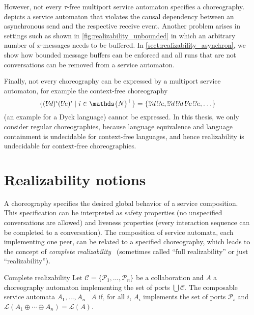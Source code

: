 However, not every $\tau$-free multiport service automaton specifies a choreography.  depicts a service automaton that violates the causal dependency between an asynchronous send and the respective receive event. Another problem arises in settings such as shown in \autoref{fig:realizability_unbounded} in which an arbitrary number of $x$-messages needs to be buffered. In \autoref{sect:realizability_asynchron}, we show how bounded message buffers can be enforced and all runs that are not conversations can be removed from a service automaton.

Finally, not every choreography can be expressed by a multiport service automaton, for example the context-free choreography$$\{({\sync d})^i({\sync e})^i\mid i\in\mathds{N}^{+}\}  = \{{\sync d}\,{\sync e},{\sync d}\,{\sync d}\,{\sync e}\,{\sync e},\dots\}$$ (an example for a Dyck language) cannot be expressed. In this thesis, we only consider regular choreographies, because language equivalence and language containment is undecidable for context-free languages, and hence realizability is undecidable for context-free choreographies.





\section{Realizability notions}
\label{sect:realizability_realizability}

A choreography specifies the desired global behavior of a service composition. This specification can be interpreted as safety properties (no unspecified conversations are allowed) and liveness properties (every interaction sequence can be completed to a conversation). The composition of service automata, each implementing one peer, can be related to a specified choreography, which leads to the concept of \emph{complete realizability}~\cite{SuBFZ_2007_wsfm,FuBS_2004_tcs,AlurEY_2003_tse,DeckerW_2007_bpm,BultanF_2008_soca,Decker_2009_zeus,Decker_2009_phd} (sometimes called ``full realizability'' or just ``realizability'').

\begin{definition}{Complete realizability}%
Let $\mathcal{C}=\{\mathcal{P}_{1},\ldots,\mathcal{P}_{n}\}$ be a collaboration and $A$ a choreography automaton implementing the set of ports $\bigcup \mathcal{C}$. The composable service automata $A_{1},\ldots,A_{n}$ ~$A$ if, for all $i$, $A_{i}$ implements the set of ports $\mathcal{P}_{i}$ and $\mathcal{L}(A_{1}\oplus\cdots\oplus A_{n})=\mathcal{L}(A)$.%
\label{def:realizability_completerealizability}%
\end{definition}

